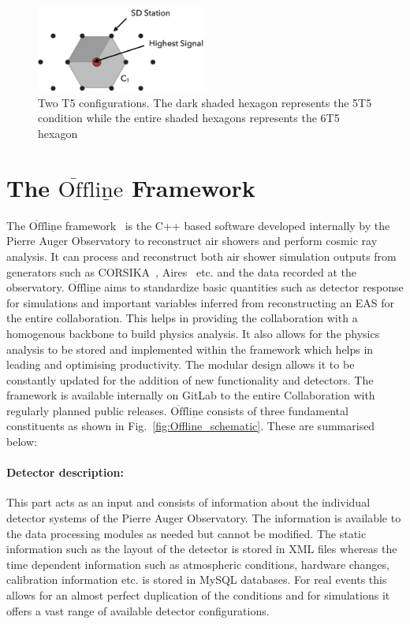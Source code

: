 \begin{figure}[t!]
  \centering
  \includegraphics[width=0.5\textwidth]{thesis_figures/Setup/T5_modes.png}
  \caption{Two T5 configurations. The dark shaded hexagon represents the 5T5 condition while the entire shaded hexagons represents the 6T5 hexagon}
  \label{fig:T5_config}
\end{figure}

\section{The \texorpdfstring{$\overline{\text{Off}} \underline{\text{line}}$}{} Framework}
\label{sec:Offline}

The $\mathrm{\overline{Off} \underline{line}}$ framework~\cite{Argiro:2007qg,PierreAuger:2023cqe} is the C++ based software developed internally by the Pierre Auger Observatory to reconstruct air showers and perform cosmic ray analysis. It can process and reconstruct both air shower simulation outputs from generators such as CORSIKA~\cite{Heck:1998vt}, Aires~\cite{Sciutto:1999jh} etc. and the data recorded at the observatory. $\mathrm{\overline{Off} \underline{line}}$ aims to standardize basic quantities such as detector response for simulations and important variables inferred from reconstructing an EAS for the entire collaboration. This helps in providing the collaboration with a homogenous backbone to build physics analysis. It also allows for the physics analysis to be stored and implemented within the framework which helps in leading and optimising productivity. The modular design allows it to be constantly updated for the addition of new functionality and detectors. The framework is available internally on GitLab to the entire Collaboration with regularly planned public releases. $\mathrm{\overline{Off} \underline{line}}$ consists of three fundamental constituents as shown in Fig.~\ref{fig:Offline_schematic}. These are summarised below:



\paragraph*{Detector description:}
This part acts as an input and consists of information about the individual detector systems of the Pierre Auger Observatory. The information is available to the data processing modules as needed but cannot be modified. The static information such as the layout of the detector is stored in XML files whereas the time dependent information such as atmospheric conditions, hardware changes, calibration information etc. is stored in MySQL databases. For real events this allows for an almost perfect duplication of the conditions and for simulations it offers a vast range of available detector configurations.  

